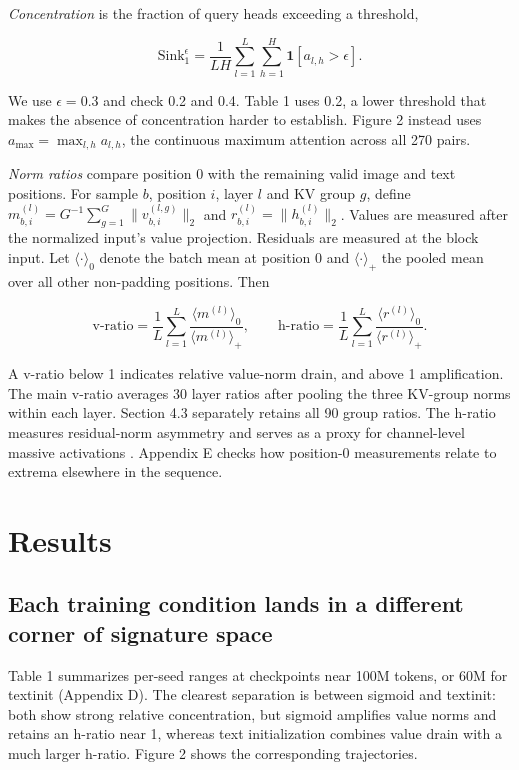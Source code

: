 \documentclass{article}
\begin{document}
\textit{Concentration} is the fraction of query heads exceeding a threshold,

\[
\mathrm{Sink}^{\epsilon}_1=\frac{1}{LH}\sum_{l=1}^{L}\sum_{h=1}^{H}
\mathbf{1}[a_{l,h}>\epsilon].
\]

We use $\epsilon=0.3$ \cite{ref6} and check 0.2 and 0.4. Table 1 uses 0.2, a lower threshold that makes the absence of concentration harder to establish. Figure 2 instead uses $a_{\max}=\max_{l,h}a_{l,h}$, the continuous maximum attention across all 270 pairs.

\textit{Norm ratios} compare position 0 with the remaining valid image and text positions. For sample $b$, position $i$, layer $l$ and KV group $g$, define $m^{(l)}_{b,i}=G^{-1}\sum_{g=1}^{G}\|v^{(l,g)}_{b,i}\|_2$ and $r^{(l)}_{b,i}=\|h^{(l)}_{b,i}\|_2$. Values are measured after the normalized input's value projection. Residuals are measured at the block input. Let $\langle\cdot\rangle_0$ denote the batch mean at position 0 and $\langle\cdot\rangle_+$ the pooled mean over all other non-padding positions. Then

\[
\text{v-ratio}=\frac{1}{L}\sum_{l=1}^{L}
\frac{\langle m^{(l)}\rangle_0}{\langle m^{(l)}\rangle_+},
\qquad
\text{h-ratio}=\frac{1}{L}\sum_{l=1}^{L}
\frac{\langle r^{(l)}\rangle_0}{\langle r^{(l)}\rangle_+}.
\]

A v-ratio below 1 indicates relative value-norm drain, and above 1 amplification. The main v-ratio averages 30 layer ratios after pooling the three KV-group norms within each layer. Section 4.3 separately retains all 90 group ratios. The h-ratio measures residual-norm asymmetry and serves as a proxy for channel-level massive activations \cite{ref2,ref5}. Appendix E checks how position-0 measurements relate to extrema elsewhere in the sequence.

\section{Results}

\subsection{Each training condition lands in a different corner of signature space}

Table 1 summarizes per-seed ranges at checkpoints near 100M tokens, or 60M for textinit (Appendix D). The clearest separation is between sigmoid and textinit: both show strong relative concentration, but sigmoid amplifies value norms and retains an h-ratio near 1, whereas text initialization combines value drain with a much larger h-ratio. Figure 2 shows the corresponding trajectories.
\end{document}
